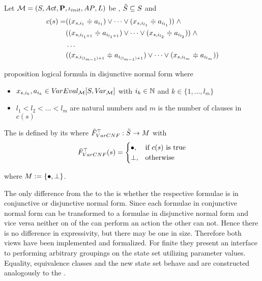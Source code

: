 \documentclass[preview]{standalone}
\begin{document}
\begin{definition}
	Let $\chgph = \chgphtuple$ be \achgphN, $\smstates \subseteq \states$ and 
	\begin{align*}
		c(s) = &((\varstate[,i_1] \eqorneq \varval_{i_1}) \lor \dots \lor (\varstate[,i_{l_1}] \eqorneq \varval_{i_{l_1}})) \; \land \\
		&((\varstate[,i_{l_1+1}] \eqorneq \varval_{i_{l_1+1}}) \lor \dots \lor (\varstate[,i_{l_2}] \eqorneq \varval_{i_{l_2}})) \; \land  \\
		&\dots \\ 
		&((\varstate[,i_{(l_{m-1})+1}] \eqorneq \varval_{i_{(l_{m-1})+1}}) \lor \dots \lor (\varstate[,i_{l_m}]  \eqorneq \varval_{i_{l_m}}))
	\end{align*}
	
	proposition logical formula in disjunctive normal form where
	\begin{itemize}
			\item $\varstate[,i_k], a_{i_k} \in \varevalimg$ with $i_k\in \natnums$ and $k \in \{1, \dots, l_m\}$
			\item $l_1 < l_2 < \dots < l_m$ are natural numbers and $m$ is the number of clauses in $c(s)$
	\end{itemize}
	The \viewN \viewparamcnf is defined by its \grpfctN \gfctparamcnf where $\gfctsubparamcnf : \smstates \to \imggrp$ with
	\[
	\gfctsubparamcnf(\state) =
	\begin{cases}
			\remelem, &\text{if } c(\state) \text{ is true}\\
			\notppty, 	&\text{otherwise}
		\end{cases}
	\]
	
	where $\imggrp := \imggrpbinview$.
\end{definition}

The only difference from the \viewN \viewparamcnf to the \viewN \viewparamdnf is whether the respective formulae is in conjunctive or disjunctive normal form. Since each formulae in conjunctive normal form can be transformed to a formulae in disjunctive normal form and vice versa neither on of the \viewsN can perform an action the other can not. Hence there is no difference in expressivity, but there may be one in size. Therefore both views have been implemented and formalized. For finite \chgphsN they present an interface to performing arbitrary groupings on the state set utilizing parameter values. Equality, equivalence classes and the new state set behave and are constructed analogously to the \viewN \viewparamdnf.
\end{document}
